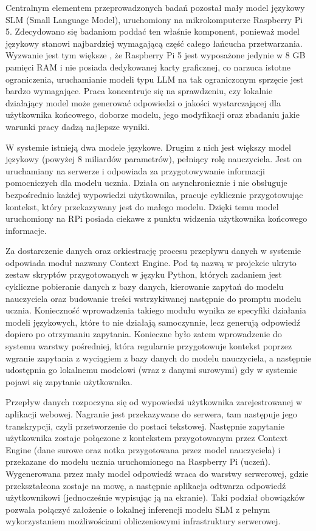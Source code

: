Centralnym elementem przeprowadzonych badań pozostał mały model językowy SLM (Small Language Model), uruchomiony na mikrokomputerze Raspberry Pi 5. Zdecydowano się badaniom poddać ten właśnie komponent, ponieważ model językowy stanowi najbardziej wymagającą część całego łańcucha przetwarzania. Wyzwanie jest tym większe , że Raspberry Pi 5 jest wyposażone jedynie w 8 GB pamięci RAM i nie posiada dedykowanej karty graficznej, co narzuca istotne ograniczenia, uruchamianie modeli typu LLM na tak ograniczonym sprzęcie jest bardzo wymagające. Praca koncentruje się na sprawdzeniu, czy lokalnie działający model może generować odpowiedzi o jakości wystarczającej dla użytkownika końcowego, doborze modelu, jego modyfikacji oraz zbadaniu jakie warunki pracy dadzą najlepsze wyniki.

W systemie istnieją dwa modele językowe. Drugim z nich jest większy model językowy (powyżej 8 miliardów parametrów), pełniący rolę nauczyciela. Jest on uruchamiany na serwerze i odpowiada za przygotowywanie informacji pomocniczych dla modelu ucznia. Działa on asynchronicznie i nie obsługuje bezpośrednio każdej wypowiedzi użytkownika, pracuje cyklicznie przygotowując kontekst, który przekazywany jest do małego modelu. Dzięki temu model uruchomiony na RPi posiada ciekawe z punktu widzenia użytkownika końcowego informacje.

Za dostarczenie danych oraz orkiestrację procesu przepływu danych w systemie odpowiada moduł nazwany Context Engine. Pod tą nazwą w projekcie ukryto zestaw skryptów przygotowanych w języku Python, których zadaniem jest cykliczne pobieranie danych z bazy danych, kierowanie zapytań do modelu nauczyciela oraz budowanie treści wstrzykiwanej następnie do promptu modelu ucznia. Konieczność wprowadzenia takiego modułu wynika ze specyfiki  działania modeli językowych, które to nie działają samoczynnie, lecz generują odpowiedź dopiero po otrzymaniu zapytania. Konieczne było zatem wprowadzenie do systemu warstwy pośredniej, która regularnie przygotowuje kontekst poprzez wgranie zapytania z wyciągiem z bazy danych do modelu nauczyciela, a następnie udostępnia go lokalnemu modelowi (wraz z danymi surowymi) gdy w systemie pojawi się zapytanie użytkownika.

Przepływ danych rozpoczyna się od wypowiedzi użytkownika zarejestrowanej w aplikacji webowej. Nagranie jest przekazywane do serwera, tam następuje jego transkrypcji, czyli przetworzenie do postaci tekstowej. Następnie zapytanie użytkownika zostaje połączone z kontekstem przygotowanym przez Context Engine (dane surowe oraz notka przygotowana przez model nauczyciela) i przekazane do modelu ucznia uruchomionego na Raspberry Pi (uczeń). Wygenerowana przez mały model odpowiedź wraca do warstwy serwerowej, gdzie przekształcona zostaje na mowę, a następnie aplikacja odtwarza odpowiedź użytkownikowi (jednocześnie wypisując ją na ekranie). Taki podział obowiązków pozwala połączyć założenie o lokalnej inferencji modelu SLM z pełnym wykorzystaniem możliwościami obliczeniowymi infrastruktury serwerowej.
